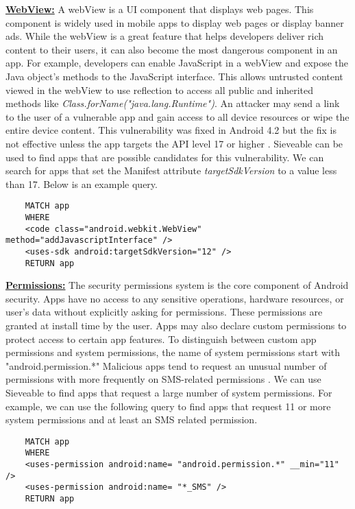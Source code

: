 \underline{\textbf{WebView:}}
A webView is a UI component that displays web pages. 
This component is widely used in mobile apps to display web pages or display banner ads.
While the webView is a great feature that helps developers deliver rich content to their users, it can also become the most dangerous component in an app.
For example, developers can enable JavaScript in a webView and expose the Java object's methods to the JavaScript interface.
This allows untrusted  content viewed in the webView to use reflection to access all public and inherited methods like \textit{Class.forName("java.lang.Runtime")}.
An attacker may send a link to the user of a vulnerable app and gain access to all device resources or wipe the entire device content. 
This vulnerability was fixed in Android 4.2 but the fix is not effective unless the app targets the API level 17 or higher \cite{WebViewVulnerability}.
Sieveable can be used to find apps that are possible candidates for this vulnerability.
We can search for apps that set the Manifest attribute \textit{targetSdkVersion} to a value less than 17.  Below is an example query.
\begin{verbatim}
	MATCH app
	WHERE
	<code class="android.webkit.WebView" method="addJavascriptInterface" />
	<uses-sdk android:targetSdkVersion="12" />
	RETURN app
\end{verbatim}

\underline{\textbf{Permissions:}}
The security permissions system is the core component of Android security.
Apps have no access to any sensitive operations, hardware resources, or user's data without explicitly asking for permissions. These permissions are granted at install time by the user.
Apps may also declare custom permissions to protect access to certain app features.
To distinguish between custom app permissions and system permissions, the name of system permissions start with "android.permission.*"
Malicious apps tend to request an unusual number of permissions with more frequently on SMS-related permissions \cite{zhou_2012_SP_dissecting}.
We can use Sieveable to find apps that request a large number of system permissions.
For example, we can use the following query to find apps that request 11 or more system permissions and at least an SMS related permission.

\begin{verbatim}
	MATCH app
	WHERE
	<uses-permission android:name= "android.permission.*" __min="11" />
	<uses-permission android:name= "*_SMS" />
	RETURN app
\end{verbatim}

